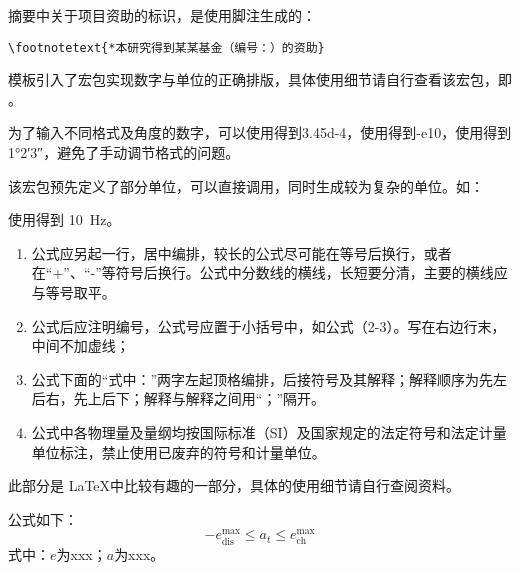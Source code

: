 摘要中关于项目资助的标识，是使用脚注生成的：

\begin{tcolorbox}
  \lstinline|\footnotetext{*本研究得到某某基金（编号：）的资助}|
\end{tcolorbox}


\clearpage



模板引入了宏包实现数字与单位的正确排版，具体使用细节请自行查看该宏包，即 。

为了输入不同格式及角度的数字，可以使用得到\num{3.45d-4}，使用得到\num{-e10}，使用得到\ang{1;2;3}，避免了手动调节格式的问题。

该宏包预先定义了部分单位，可以直接调用，同时生成较为复杂的单位。如：

使用得到 \SI{10}{\hertz}。



\begin{tcolorbox}[colback=red!5!white,colframe=red!75!black]
  \begin{enumerate}[leftmargin=0.5cm]
    \item 公式应另起一行，居中编排，较长的公式尽可能在等号后换行，或者在“+”、“-”等符号后换行。公式中分数线的横线，长短要分清，主要的横线应与等号取平。
    \item 公式后应注明编号，公式号应置于小括号中，如公式（2-3）。写在右边行末，中间不加虚线；
    \item 公式下面的“式中：”两字左起顶格编排，后接符号及其解释；解释顺序为先左后右，先上后下；解释与解释之间用“；”隔开。
    \item 公式中各物理量及量纲均按国际标准（SI）及国家规定的法定符号和法定计量单位标注，禁止使用已废弃的符号和计量单位。
  \end{enumerate}
\end{tcolorbox}

此部分是 \LaTeX 中比较有趣的一部分，具体的使用细节请自行查阅资料。

\begin{texcode}[]{}
  公式如下：
  \begin{equation}
      -e^{\max}_\text{dis} \leq a_t \leq e^{\max}_\text{ch}\label{equation:c1:mdl:cstr_dis}
  \end{equation}
  式中：$e$为xxx；$a$为xxx。
\end{texcode}

